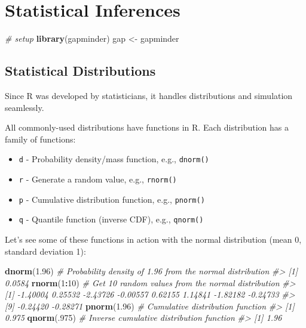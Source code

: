 \documentclass[]{book}
\newenvironment{Shaded}{\begin{snugshade}}{\end{snugshade}}
\newcommand{\KeywordTok}[1]{\textcolor[rgb]{0.13,0.29,0.53}{\textbf{#1}}}
\newcommand{\DecValTok}[1]{\textcolor[rgb]{0.00,0.00,0.81}{#1}}
\newcommand{\FloatTok}[1]{\textcolor[rgb]{0.00,0.00,0.81}{#1}}
\newcommand{\StringTok}[1]{\textcolor[rgb]{0.31,0.60,0.02}{#1}}
\newcommand{\CommentTok}[1]{\textcolor[rgb]{0.56,0.35,0.01}{\textit{#1}}}
\newcommand{\OperatorTok}[1]{\textcolor[rgb]{0.81,0.36,0.00}{\textbf{#1}}}
\newcommand{\NormalTok}[1]{#1}
\providecommand{\tightlist}{%
  \setlength{\itemsep}{0pt}\setlength{\parskip}{0pt}}
\begin{document}
\chapter{Statistical Inferences}\label{statistical-inferences}

\begin{Shaded}
\begin{Highlighting}[]
\CommentTok{# setup}
\KeywordTok{library}\NormalTok{(gapminder)}
\NormalTok{gap <-}\StringTok{ }\NormalTok{gapminder}
\end{Highlighting}
\end{Shaded}

\section{Statistical Distributions}\label{statistical-distributions}

Since R was developed by statisticians, it handles distributions and
simulation seamlessly.

All commonly-used distributions have functions in R. Each distribution
has a family of functions:

\begin{itemize}
\tightlist
\item
  \texttt{d} - Probability density/mass function, e.g., \texttt{dnorm()}
\item
  \texttt{r} - Generate a random value, e.g., \texttt{rnorm()}
\item
  \texttt{p} - Cumulative distribution function, e.g., \texttt{pnorm()}
\item
  \texttt{q} - Quantile function (inverse CDF), e.g., \texttt{qnorm()}
\end{itemize}

Let's see some of these functions in action with the normal distribution
(mean 0, standard deviation 1):

\begin{Shaded}
\begin{Highlighting}[]
\KeywordTok{dnorm}\NormalTok{(}\FloatTok{1.96}\NormalTok{) }\CommentTok{# Probability density of 1.96 from the normal distribution}
\CommentTok{#> [1] 0.0584}
\KeywordTok{rnorm}\NormalTok{(}\DecValTok{1}\OperatorTok{:}\DecValTok{10}\NormalTok{) }\CommentTok{# Get 10 random values from the normal distribution}
\CommentTok{#>  [1] -1.40004  0.25532 -2.43726 -0.00557  0.62155  1.14841 -1.82182 -0.24733}
\CommentTok{#>  [9] -0.24420 -0.28271}
\KeywordTok{pnorm}\NormalTok{(}\FloatTok{1.96}\NormalTok{) }\CommentTok{# Cumulative distribution function}
\CommentTok{#> [1] 0.975}
\KeywordTok{qnorm}\NormalTok{(.}\DecValTok{975}\NormalTok{) }\CommentTok{# Inverse cumulative distribution function}
\CommentTok{#> [1] 1.96}
\end{Highlighting}
\end{Shaded}
\end{document}
